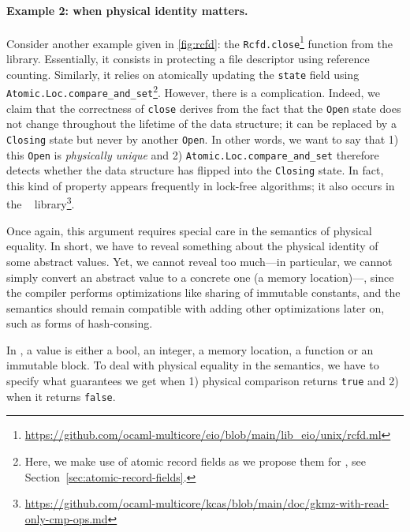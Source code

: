 \paragraph{Example 2: when physical identity matters.}

Consider another example given in \cref{fig:rcfd}: the \texttt{Rcfd.close}\footnote{\url{https://github.com/ocaml-multicore/eio/blob/main/lib_eio/unix/rcfd.ml}} function from the \Eio~\cite{eio} library.
Essentially, it consists in protecting a file descriptor using reference counting.
Similarly, it relies on atomically updating the \texttt{state} field using \texttt{Atomic.Loc.compare_and_set}\footnote{Here, we make use of atomic record fields as we propose them for \OCaml, see Section~\ref{sec:atomic-record-fields}.}.
However, there is a complication.
Indeed, we claim that the correctness of \texttt{close} derives from the fact that the \texttt{Open} state does not change throughout the lifetime of the data structure; it can be replaced by a \texttt{Closing} state but never by another \texttt{Open}.
In other words, we want to say that 1) this \texttt{Open} is \emph{physically unique} and 2) \texttt{Atomic.Loc.compare_and_set} therefore detects whether the data structure has flipped into the \texttt{Closing} state.
In fact, this kind of property appears frequently in lock-free algorithms; it also occurs in the \Kcas~\cite{kcas} library\footnote{\url{https://github.com/ocaml-multicore/kcas/blob/main/doc/gkmz-with-read-only-cmp-ops.md}}.

Once again, this argument requires special care in the semantics of physical equality.
In short, we have to reveal something about the physical identity of some abstract values.
Yet, we cannot reveal too much---in particular, we cannot simply convert an abstract value to a concrete one (a memory location)---, since the \OCaml compiler performs optimizations like sharing of immutable constants, and the semantics should remain compatible with adding other optimizations later on, such as forms of hash-consing.


In \Zoo, a value is either a bool, an integer, a memory location, a function or an immutable block.
To deal with physical equality in the semantics, we have to specify what guarantees we get when 1) physical comparison returns \texttt{true} and 2) when it returns \texttt{false}.

